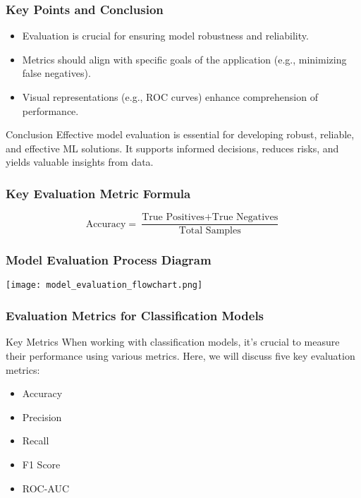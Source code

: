 \documentclass[aspectratio=169]{beamer}
\begin{document}
\begin{frame}[fragile]
    \frametitle{Key Points and Conclusion}
    \begin{itemize}
        \item Evaluation is crucial for ensuring model robustness and reliability.
        \item Metrics should align with specific goals of the application (e.g., minimizing false negatives).
        \item Visual representations (e.g., ROC curves) enhance comprehension of performance.
    \end{itemize}
    \begin{block}{Conclusion}
        Effective model evaluation is essential for developing robust, reliable, and effective ML solutions. It supports informed decisions, reduces risks, and yields valuable insights from data.
    \end{block}
\end{frame}

\begin{frame}[fragile]
    \frametitle{Key Evaluation Metric Formula}
    \begin{equation}
        \text{Accuracy} = \frac{\text{True Positives} + \text{True Negatives}}{\text{Total Samples}}
    \end{equation}
\end{frame}

\begin{frame}[fragile]
    \frametitle{Model Evaluation Process Diagram}
    \centering
    \texttt{[image: model\_evaluation\_flowchart.png]}
\end{frame}

\begin{frame}[fragile]
    \frametitle{Evaluation Metrics for Classification Models}
    \begin{block}{Key Metrics}
        When working with classification models, it's crucial to measure their performance using various metrics. 
        Here, we will discuss five key evaluation metrics:
        \begin{itemize}
            \item Accuracy
            \item Precision
            \item Recall
            \item F1 Score
            \item ROC-AUC
        \end{itemize}
    \end{block}
\end{frame}
\end{document}
